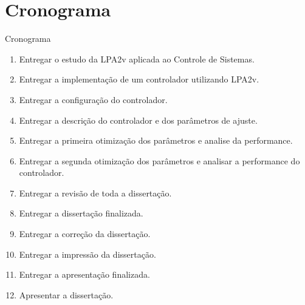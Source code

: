 \section{Cronograma}

\begin{frame}{Cronograma}
\begin{enumerate}\small
  \item \label{LPA2v}       Entregar o estudo da LPA2v aplicada ao Controle de Sistemas.
  \item \label{controlar}   Entregar a implementação de um controlador utilizando LPA2v.
  \item \label{configurar}  Entregar a configuração do controlador.
  \item \label{descrever}   Entregar a descrição do controlador e dos parâmetros de ajuste.
  \item \label{otimizar1}   Entregar a primeira otimização dos parâmetros e analise da performance.
  \item \label{otimizar2}   Entregar a segunda otimização dos parâmetros e analisar a performance do controlador.
  \item \label{entregar}    Entregar a revisão de toda a dissertação.
  \item \label{finalizar}   Entregar a dissertação finalizada.
  \item \label{corrigir}    Entregar a correção da dissertação.
  \item \label{imprimir}    Entregar a impressão da dissertação.
  \item \label{finalApres}  Entregar a apresentação finalizada.
  \item \label{apresentar}  Apresentar a dissertação.
\end{enumerate}
\end{frame}




